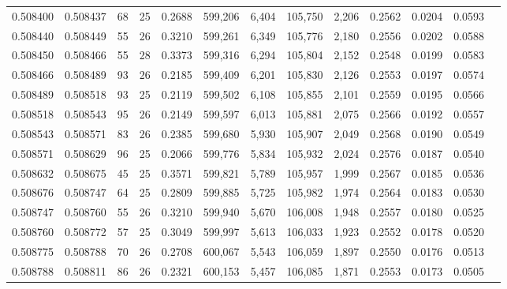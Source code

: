 \begin{tabular}{rrrrrrrrrrrrr}
0.508400 & 0.508437 &  68 &  25 &                                     0.2688 & 599,206 &   6,404 & 105,750 &   2,206 & 0.2562 & 0.0204 & 0.0593 \\
0.508440 & 0.508449 &  55 &  26 &                                     0.3210 & 599,261 &   6,349 & 105,776 &   2,180 & 0.2556 & 0.0202 & 0.0588 \\
0.508450 & 0.508466 &  55 &  28 &                                     0.3373 & 599,316 &   6,294 & 105,804 &   2,152 & 0.2548 & 0.0199 & 0.0583 \\
0.508466 & 0.508489 &  93 &  26 &                                     0.2185 & 599,409 &   6,201 & 105,830 &   2,126 & 0.2553 & 0.0197 & 0.0574 \\
0.508489 & 0.508518 &  93 &  25 &                                     0.2119 & 599,502 &   6,108 & 105,855 &   2,101 & 0.2559 & 0.0195 & 0.0566 \\
0.508518 & 0.508543 &  95 &  26 &                                     0.2149 & 599,597 &   6,013 & 105,881 &   2,075 & 0.2566 & 0.0192 & 0.0557 \\
0.508543 & 0.508571 &  83 &  26 &                                     0.2385 & 599,680 &   5,930 & 105,907 &   2,049 & 0.2568 & 0.0190 & 0.0549 \\
0.508571 & 0.508629 &  96 &  25 &                                     0.2066 & 599,776 &   5,834 & 105,932 &   2,024 & 0.2576 & 0.0187 & 0.0540 \\
0.508632 & 0.508675 &  45 &  25 &                                     0.3571 & 599,821 &   5,789 & 105,957 &   1,999 & 0.2567 & 0.0185 & 0.0536 \\
0.508676 & 0.508747 &  64 &  25 &                                     0.2809 & 599,885 &   5,725 & 105,982 &   1,974 & 0.2564 & 0.0183 & 0.0530 \\
0.508747 & 0.508760 &  55 &  26 &                                     0.3210 & 599,940 &   5,670 & 106,008 &   1,948 & 0.2557 & 0.0180 & 0.0525 \\
0.508760 & 0.508772 &  57 &  25 &                                     0.3049 & 599,997 &   5,613 & 106,033 &   1,923 & 0.2552 & 0.0178 & 0.0520 \\
0.508775 & 0.508788 &  70 &  26 &                                     0.2708 & 600,067 &   5,543 & 106,059 &   1,897 & 0.2550 & 0.0176 & 0.0513 \\
0.508788 & 0.508811 &  86 &  26 &                                     0.2321 & 600,153 &   5,457 & 106,085 &   1,871 & 0.2553 & 0.0173 & 0.0505 \\

\end{tabular}

